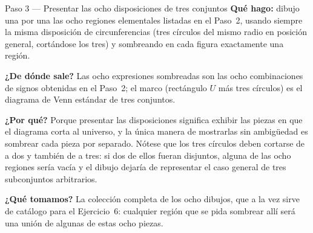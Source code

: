 \documentclass[11pt]{article}
\begin{document}
\begin{paso}{Paso 3 --- Presentar las ocho disposiciones de tres conjuntos}
\textbf{Qué hago:} dibujo una por una las ocho regiones elementales listadas en el Paso~2,
usando siempre la misma disposición de circunferencias (tres círculos del mismo radio en
posición general, cortándose los tres) y sombreando en cada figura exactamente una región.

\textbf{¿De dónde sale?} Las ocho expresiones sombreadas son las ocho combinaciones de signos
obtenidas en el Paso~2; el marco (rectángulo $U$ más tres círculos) es el diagrama de Venn
estándar de tres conjuntos.

\textbf{¿Por qué?} Porque presentar las disposiciones significa exhibir las piezas en que el
diagrama corta al universo, y la única manera de mostrarlas sin ambigüedad es sombrear cada
pieza por separado. Nótese que los tres círculos deben cortarse de a dos y también de a tres:
si dos de ellos fueran disjuntos, alguna de las ocho regiones sería vacía y el dibujo dejaría de
representar el caso general de tres subconjuntos arbitrarios.

\textbf{¿Qué tomamos?} La colección completa de los ocho dibujos, que a la vez sirve de catálogo
para el Ejercicio~6: cualquier región que se pida sombrear allí será una unión de algunas de
estas ocho piezas.
\end{paso}
\end{document}

